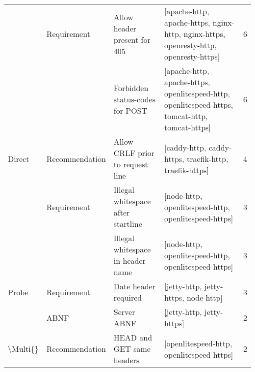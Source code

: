 \begin{tabular}{llllr}
         & Requirement & Allow header present for 405 &                                                                                                                                                   [apache-http, apache-https, nginx-http, nginx-https, openresty-http, openresty-https] &        6 \\
         &             & Forbidden status-codes for POST &                                                                                                                                         [apache-http, apache-https, openlitespeed-http, openlitespeed-https, tomcat-http, tomcat-https] &        6 \\
Direct & Recommendation & Allow CRLF prior to request line &                                                                                                                                                                                  [caddy-http, caddy-https, traefik-http, traefik-https] &        4 \\
         & Requirement & Illegal whitespace after startline &                                                                                                                                                                                    [node-http, openlitespeed-http, openlitespeed-https] &        3 \\
         &             & Illegal whitespace in header name &                                                                                                                                                                                    [node-http, openlitespeed-http, openlitespeed-https] &        3 \\
Probe & Requirement & Date header required &                                                                                                                                                                                                    [jetty-http, jetty-https, node-http] &        3 \\
         & ABNF & Server ABNF &                                                                                                                                                                                                               [jetty-http, jetty-https] &        2 \\
\textbackslash Multi\{\} & Recommendation & HEAD and GET same headers &                                                                                                                                                                                               [openlitespeed-http, openlitespeed-https] &        2 \\

\end{tabular}
